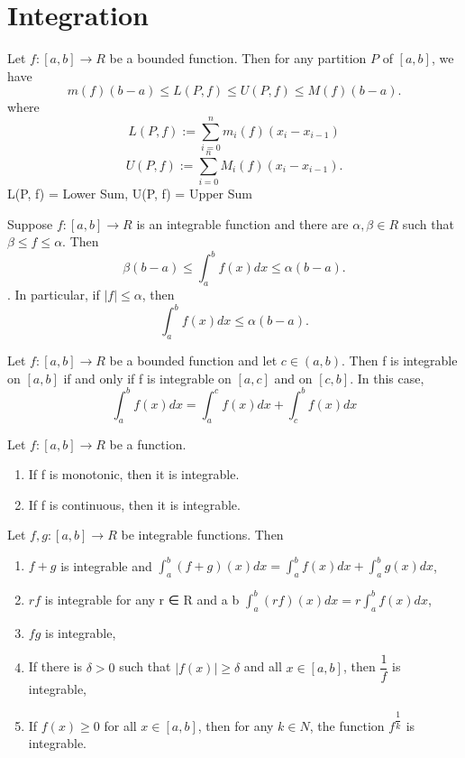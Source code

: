 \documentclass[a4paper,oneside]{book}
\begin{document}
\chapter{Integration}
\begin{proposition}
Let $f : \left[a,b\right] \to R$ be a bounded function. Then for any
partition $P$ of $\left[a,b\right]$, we have 
 $$ m(f )(b - a) \le L(P, f ) \le U (P, f ) \le M (f )(b - a). $$
 where 
 $$  L(P, f ) :=  \sum_{i=0}^{n} m_i (f )(x_i - x_{i-1} )$$
 $$  U (P, f ) :=  \sum_{i=0}^{n} M_i (f )(x_i - x_{i-1} ).$$
 L(P, f) = Lower Sum, U(P, f) = Upper Sum
\end{proposition}
\begin{proposition}
 Suppose $f : \left[a,b\right]  \to R$ is an integrable function and there are $\alpha, \beta \in R$ such that $ \beta \le f \le \alpha$. Then
$$ \beta (b - a) \le \int_{a}^{b} f (x)dx \le \alpha(b - a). $$. In particular, if $\left|f\right| \le \alpha$, then
$$ \int_{a}^{b} f (x)dx \le \alpha(b - a). $$
\end{proposition}
\begin{proposition}
 Let $f : [a, b] \to R$ be a bounded function and let $c \in (a, b)$. Then f is integrable on $\left[a,b\right]$ if and only if f is integrable on $\left[a,c\right]$ and on $\left[c,b\right]$. In this case,
$$ \int_{a}^{b} f(x)dx = \int_{a}^{c} f(x)dx + \int_{c}^{b} f(x)dx$$
\end{proposition}
\begin{proposition}
 Let $f : [a, b] \to R$ be a function.
\begin{enumerate}
\item If f is monotonic, then it is integrable.
\item If f is continuous, then it is integrable.
\end{enumerate}
\end{proposition}
\begin{proposition}
Let $f, g : [a, b] \to R$ be integrable functions. Then
\begin{enumerate}
\item $f + g$ is integrable and $\int_{a}^{b}(f + g)(x)dx = \int_{a}^{b}f (x)dx + \int_{a}^{b}g(x)dx$,
\item $rf$ is integrable for any r ∈ R and a b
 $ \int_{a}^{b}(rf )(x)dx = r \int_{a}^{b} f (x)dx$,
\item $fg$ is integrable,
\item If there is $ \delta > 0$ such that $\left|f(x)\right| \ge \delta$ and all $x \in [a, b]$, then $\dfrac{1}{f}$ is integrable,
\item If $f (x) \ge 0$ for all $x \in [a, b]$, then for any $k \in N$, the function $f^{\dfrac{1}{k}}$ is integrable.
\end{enumerate}
\end{proposition}
\end{document}
